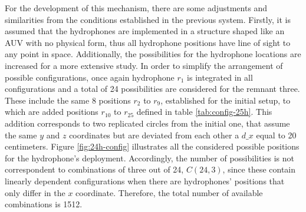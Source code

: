 \begin{itemize}
For the development of this mechanism, there are some adjustments and similarities from the conditions established in the previous system. Firstly, it is assumed that the hydrophones are implemented in a structure shaped like an AUV with no physical form, thus all hydrophone positions have line of sight to any point in space. Additionally, the possibilities for the hydrophone locations are increased for a more extensive study. In order to simplify the arrangement of possible configurations, once again hydrophone $r_1$ is integrated in all configurations and a total of 24 possibilities are considered for the remnant three. These include the same 8 positions $r_2$ to $r_9$, established for the initial setup, to which are added positions $r_10$ to $r_25$ defined in table \ref{tab:config-25h}. This addition corresponds to two replicated circles from the initial one, that assume the same $y$ and $z$ coordinates but are deviated from each other a $d\_x$ equal to 20 centimeters. Figure \ref{fig:24h-config} illustrates all the considered possible positions for the hydrophone's deployment. Accordingly, the number of possibilities is not correspondent to combinations of three out of 24, $C(24,3)$, since these contain linearly dependent configurations when there are hydrophones' positions that only differ in the $x$ coordinate. Therefore, the total number of available combinations is 1512.

\begin{table}[!htbp] %
	\begin{center}
		\caption{Additional coordinates for an implementation with 25 hydrophones}
		\label{tab:config-25h}
	\end{center}
\end{table}


\end{itemize}
